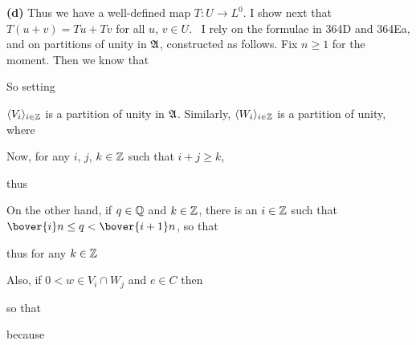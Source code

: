 {{\bf (d)} Thus we have a well-defined map $T:U\to L^0$.
I show next that $T(u+v)=Tu+Tv$ for all $u$, $v\in U$.   \Prf\ I rely on
the formulae in 364D and 364Ea, and on partitions of unity in $\frak A$,
constructed as follows.   Fix $n\ge 1$ for the moment.   Then we know
that


\noindent So setting


\noindent $\langle V_i\rangle_{i\in\Bbb Z}$ is a partition of unity in
$\frak A$.   Similarly, $\langle W_i\rangle_{i\in\Bbb Z}$ is a partition
of unity, where


\noindent Now, for any $i$, $j$, $k\in\Bbb Z$ such that $i+j\ge k$,


\noindent thus


\noindent On the other hand, if $q\in\Bbb Q$ and $k\in\Bbb Z$, there is
an $i\in\Bbb Z$ such that $\bover{i}n\le q<\bover{i+1}n$, so that


\noindent thus for any $k\in\Bbb Z$


Also, if $0<w\in V_i\cap W_j$ and $e\in C$ then


\noindent so that


\noindent because


}
